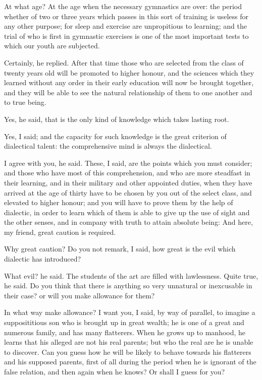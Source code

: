 At what age?
At the age when the necessary gymnastics are over: the period whether of two or three years which passes in this sort of training is useless for any other purpose; for sleep and exercise are unpropitious to learning; and the trial of who is first in gymnastic exercises is one of the most important tests to which our youth are subjected.

Certainly, he replied.
After that time those who are selected from the class of twenty years old will be promoted to higher honour, and the sciences which they learned without any order in their early education will now be brought together, and they will be able to see the natural relationship of them to one another and to true being.

Yes, he said, that is the only kind of knowledge which takes lasting root.

Yes, I said; and the capacity for such knowledge is the great criterion of dialectical talent: the comprehensive mind is always the dialectical.

I agree with you, he said.
These, I said, are the points which you must consider; and those who have most of this comprehension, and who are more steadfast in their learning, and in their military and other appointed duties, when they have arrived at the age of thirty have to be chosen by you out of the select class, and elevated to higher honour; and you will have to prove them by the help of dialectic, in order to learn which of them is able to give up the use of sight and the other senses, and in company with truth to attain absolute being: And here, my friend, great caution is required.

Why great caution?
Do you not remark, I said, how great is the evil which dialectic has introduced?

What evil? he said.
The students of the art are filled with lawlessness.
Quite true, he said.
Do you think that there is anything so very unnatural or inexcusable in their case? or will you make allowance for them?

In what way make allowance?
I want you, I said, by way of parallel, to imagine a supposititious son who is brought up in great wealth; he is one of a great and numerous family, and has many flatterers. When he grows up to manhood, he learns that his alleged are not his real parents; but who the real are he is unable to discover. Can you guess how he will be likely to behave towards his flatterers and his supposed parents, first of all during the period when he is ignorant of the false relation, and then again when he knows? Or shall I guess for you?

